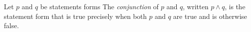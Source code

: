 \guard





\begin{defn}
\label{defn:conjunctionOfStatement}
  Let $p$ and $q$ be statements forms
  The \emph{conjunction} of $p$ and $q$, written $p \wedge q$, is the statement form that is true precisely when both $p$ and $q$ are true and is otherwise false.
\end{defn}
